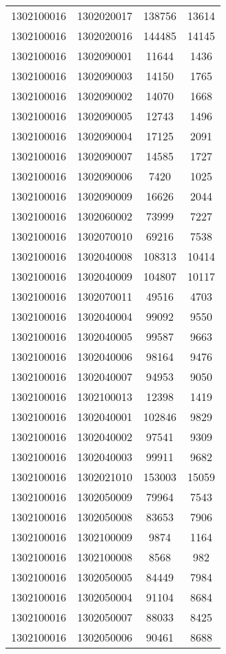 \begin{longtable}[h]{llcc}
		1302100016 & 1302020017 & 138756 & 13614\\
		1302100016 & 1302020016 & 144485 & 14145\\
		1302100016 & 1302090001 & 11644 & 1436\\
		1302100016 & 1302090003 & 14150 & 1765\\
		1302100016 & 1302090002 & 14070 & 1668\\
		1302100016 & 1302090005 & 12743 & 1496\\
		1302100016 & 1302090004 & 17125 & 2091\\
		1302100016 & 1302090007 & 14585 & 1727\\
		1302100016 & 1302090006 & 7420 & 1025\\
		1302100016 & 1302090009 & 16626 & 2044\\
		1302100016 & 1302060002 & 73999 & 7227\\
		1302100016 & 1302070010 & 69216 & 7538\\
		1302100016 & 1302040008 & 108313 & 10414\\
		1302100016 & 1302040009 & 104807 & 10117\\
		1302100016 & 1302070011 & 49516 & 4703\\
		1302100016 & 1302040004 & 99092 & 9550\\
		1302100016 & 1302040005 & 99587 & 9663\\
		1302100016 & 1302040006 & 98164 & 9476\\
		1302100016 & 1302040007 & 94953 & 9050\\
		1302100016 & 1302100013 & 12398 & 1419\\
		1302100016 & 1302040001 & 102846 & 9829\\
		1302100016 & 1302040002 & 97541 & 9309\\
		1302100016 & 1302040003 & 99911 & 9682\\
		1302100016 & 1302021010 & 153003 & 15059\\
		1302100016 & 1302050009 & 79964 & 7543\\
		1302100016 & 1302050008 & 83653 & 7906\\
		1302100016 & 1302100009 & 9874 & 1164\\
		1302100016 & 1302100008 & 8568 & 982\\
		1302100016 & 1302050005 & 84449 & 7984\\
		1302100016 & 1302050004 & 91104 & 8684\\
		1302100016 & 1302050007 & 88033 & 8425\\
		1302100016 & 1302050006 & 90461 & 8688\\

\end{longtable}
